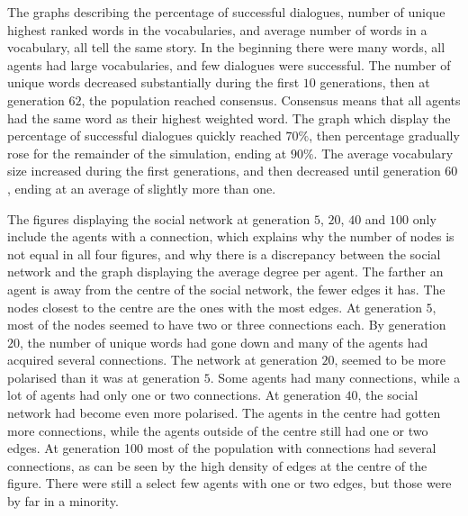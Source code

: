 The graphs describing the percentage of successful dialogues, number of unique highest ranked words in the vocabularies, and average number of words in a vocabulary, all tell the same story. In the beginning there were many words, all agents had large vocabularies, and few dialogues were successful. The number of unique words decreased substantially during the first $10$ generations, then at generation $62$, the population reached consensus. Consensus means that all agents had the same word as their highest weighted word. The graph which display the percentage of successful dialogues quickly reached $70\%$, then percentage gradually rose for the remainder of the simulation, ending at $90\%$. The average vocabulary size increased during the first generations, and then decreased until generation $60$, ending at an average of slightly more than one.

The figures displaying the social network at generation $5$, $20$, $40$ and $100$ only include the agents with a connection, which explains why the number of nodes is not equal in all four figures, and why there is a discrepancy between the social network and the graph displaying the average degree per agent. The farther an agent is away from the centre of the social network, the fewer edges it has. The nodes closest to the centre are the ones with the most edges. At generation $5$, most of the nodes seemed to have two or three connections each. By generation $20$, the number of unique words had gone down and many of the agents had acquired several connections. The network at generation $20$, seemed to be more polarised than it was at generation $5$. Some agents had many connections, while a lot of agents had only one or two connections. At generation $40$, the social network had become even more polarised. The agents in the centre had gotten more connections, while the agents outside of the centre still had one or two edges. At generation 100 most of the population with connections had several connections, as can be seen by the high density of edges at the centre of the figure. There were still a select few agents with one or two edges, but those were by far in a minority.

